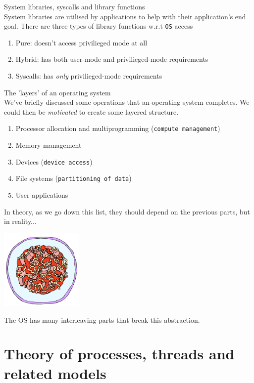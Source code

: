 \documentclass[journal, letterpaper]{IEEEtran}
\begin{document}
\begin{theory}{System libraries, syscalls and library functions} \\ 
    System libraries are utilised by applications to help with their application's end goal. There are three types of library functions w.r.t \verb|OS| access
    \begin{enumerate}
        \item Pure: doesn't access privilieged mode at all
        \item Hybrid: has both user-mode and privilieged-mode requirements
        \item Syscalls: has \textit{only} privilieged-mode requirements
    \end{enumerate}
\end{theory}
\begin{example}{The 'layers' of an operating system} \\ 
    We've briefly discussed some operations that an operating system completes. We could then be \textit{motivated} to create some layered structure.
    \begin{enumerate}
        \item Processor allocation and multiprogramming (\verb|compute management|)
        \item Memory management
        \item Devices (\verb|device access|)
        \item File systems (\verb|partitioning of data|)
        \item User applications
    \end{enumerate}
    In theory, as we go down this list, they should depend on the previous parts, but in reality...
    \begin{center}
        \includegraphics[width=4cm]{./photos/os_spaghetti.png}
    \end{center}
    The OS has many interleaving parts that break this abstraction.
\end{example}
\section{Theory of processes, threads and related models}
\end{document}
